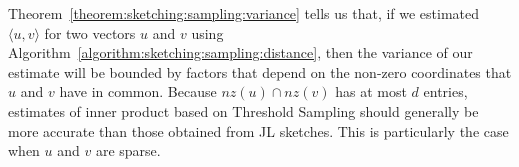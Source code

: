 \begin{svgraybox}
    Theorem~\ref{theorem:sketching:sampling:variance} tells us that, if we estimated $\langle u, v \rangle$
    for two vectors $u$ and $v$ using Algorithm~\ref{algorithm:sketching:sampling:distance},
    then the variance of our estimate will be bounded by factors that depend on the
    non-zero coordinates that $u$ and $v$ have in common. Because $\mathit{nz}(u) \cap \mathit{nz}(v)$
    has at most $d$ entries, estimates of inner product based on Threshold Sampling should generally be more accurate than
    those obtained from JL sketches. This is particularly the case when $u$ and $v$ are sparse.
\end{svgraybox}







    
